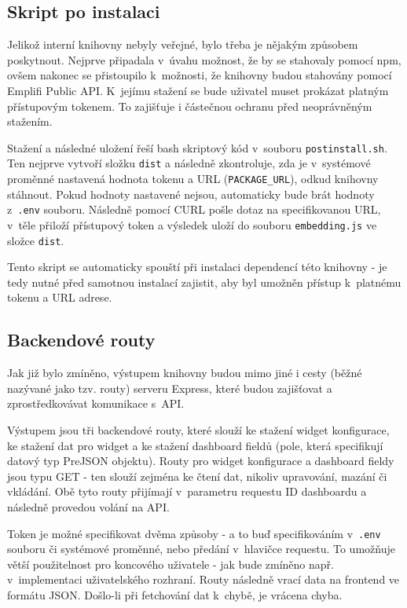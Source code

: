 \documentclass[czech, bc, kiv, he, iso690numb, viewonly]{fasthesis} %
\begin{document}
\subsection{Skript po instalaci}

Jelikož interní knihovny nebyly veřejné, bylo třeba je nějakým způsobem poskytnout. Nejprve připadala v~úvahu možnost, že by se stahovaly pomocí npm, ovšem
nakonec se přistoupilo k~možnosti, že knihovny budou stahovány pomocí Emplifi Public API. K~jejímu stažení se bude uživatel muset prokázat platným přístupovým tokenem.
To zajišťuje i částečnou ochranu před neoprávněným stažením.

Stažení a následné uložení řeší bash skriptový kód v~souboru \texttt{postinstall.sh}. Ten nejprve vytvoří složku \texttt{dist} a následně zkontroluje, zda je v~systémové proměnné
nastavená hodnota tokenu a URL (\texttt{PACKAGE\_URL}), odkud knihovny stáhnout. Pokud hodnoty nastavené nejsou, automaticky bude brát hodnoty z~\texttt{.env} souboru. Následně pomocí CURL pošle dotaz na
specifikovanou URL, v~těle přiloží přístupový token a výsledek uloží do souboru \texttt{embedding.js} ve složce \texttt{dist}.

Tento skript se automaticky spouští při instalaci dependencí této knihovny - je tedy nutné před samotnou instalací zajistit, aby byl umožněn přístup k~platnému tokenu a URL adrese.

\subsection{Backendové routy}

Jak již bylo zmíněno, výstupem knihovny budou mimo jiné i cesty (běžné nazývané jako tzv. routy) serveru Express, které budou zajišťovat a zprostředkovávat komunikace s~API.

Výstupem jsou tři backendové routy, které slouží ke stažení widget konfigurace, ke stažení dat pro widget a ke stažení dashboard fieldů (pole, která specifikují datový typ PreJSON objektu).
Routy pro widget konfigurace a dashboard fieldy jsou typu GET - ten slouží zejména ke čtení dat, nikoliv upravování, mazání či vkládání. Obě tyto routy přijímají v~parametru requestu ID
dashboardu a následně provedou volání na API. 

Token je možné specifikovat dvěma způsoby - a to buď specifikováním v~\texttt{.env} souboru či systémové proměnné, nebo předání v~hlavičce requestu. To umožňuje větší použitelnost pro koncového
uživatele - jak bude zmíněno např. v~implementaci uživatelského rozhraní. Routy následně vrací data na frontend ve formátu JSON. Došlo-li při fetchování dat k~chybě, je vrácena chyba.
\end{document}
